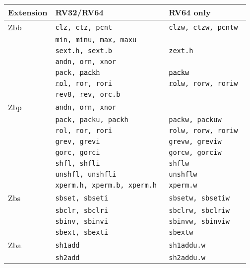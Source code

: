 \begin{table}[!h]
\begin{center}
\begin{tabular}{lll}
Extension & RV32/RV64 & RV64 only \\
\hline
Zbb
 & {\tt clz, ctz, pcnt            } & {\tt clzw, ctzw, pcntw         } \\
 & {\tt min, minu, max, maxu      } & {\tt                           } \\
 & {\tt sext.h, sext.b            } & {\tt zext.h                    } \\
 & {\tt andn, orn, xnor           } & {\tt                           } \\
 & {\tt pack, \sout{packh}        } & {\tt \sout{packw}              } \\
 & {\tt \sout{rol}, ror, rori     } & {\tt \sout{rolw}, rorw, roriw  } \\
 & {\tt rev8, \sout{rev}, orc.b   } & {\tt                           } \\
\hline
Zbp
 & {\tt andn, orn, xnor           } & {\tt                           } \\
 & {\tt pack, packu, packh        } & {\tt packw, packuw             } \\
 & {\tt rol, ror, rori            } & {\tt rolw, rorw, roriw         } \\
 & {\tt grev, grevi               } & {\tt grevw, greviw             } \\
 & {\tt gorc, gorci               } & {\tt gorcw, gorciw             } \\
 & {\tt shfl, shfli               } & {\tt shflw                     } \\
 & {\tt unshfl, unshfli           } & {\tt unshflw                   } \\
 & {\tt xperm.h, xperm.b, xperm.h } & {\tt xperm.w                   } \\
\hline
Zbs
 & {\tt sbset, sbseti             } & {\tt sbsetw, sbsetiw           } \\
 & {\tt sbclr, sbclri             } & {\tt sbclrw, sbclriw           } \\
 & {\tt sbinv, sbinvi             } & {\tt sbinvw, sbinviw           } \\
 & {\tt sbext, sbexti             } & {\tt sbextw                    } \\
\hline
Zba
 & {\tt sh1add                    } & {\tt sh1addu.w                 } \\
 & {\tt sh2add                    } & {\tt sh2addu.w                 } \\

\end{tabular}
\end{center}
\end{table}

